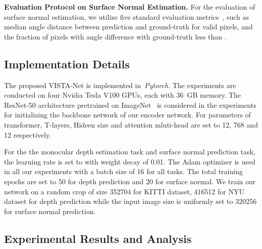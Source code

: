 \par\noindent\textbf{Evaluation Protocol on Surface Normal Estimation.} For the evaluation of surface normal estimation, we utilize five standard evaluation metrics~\cite{fouhey2013data},  such as median angle distance between prediction and ground-truth for valid pixels, and the fraction of pixels with angle difference with ground-truth less than  . 

\subsection{Implementation Details} 
The proposed VISTA-Net is implemented in~\textit{Pytorch}. The experiments are conducted on four Nvidia Tesla V100 GPUs, each with 36~GB memory. The ResNet-50 architecture pretrained on ImageNet~\cite{deng2009imagenet} is considered in the experiments for initializing the backbone network of our encoder network. For parameters of transformer, T-layers, Hideen size and attention mluti-head are set to 12, 768 and 12 respectively.

For the the monocular depth estimation task and surface normal prediction task, the learning rate is set to  with weight decay of 0.01. The Adam optimizer is used in all our experiments with a batch size of 16 for all tasks. 
The total training epochs are set to 50 for depth prediction and 20 for surface normal.  We train our network on a random crop of size 352704 for KITTI dataset, 416512 for NYU dataset for depth prediction while
the input image size is uniformly set to 320256 for surface normal prediction.

\subsection{Experimental Results and Analysis}

